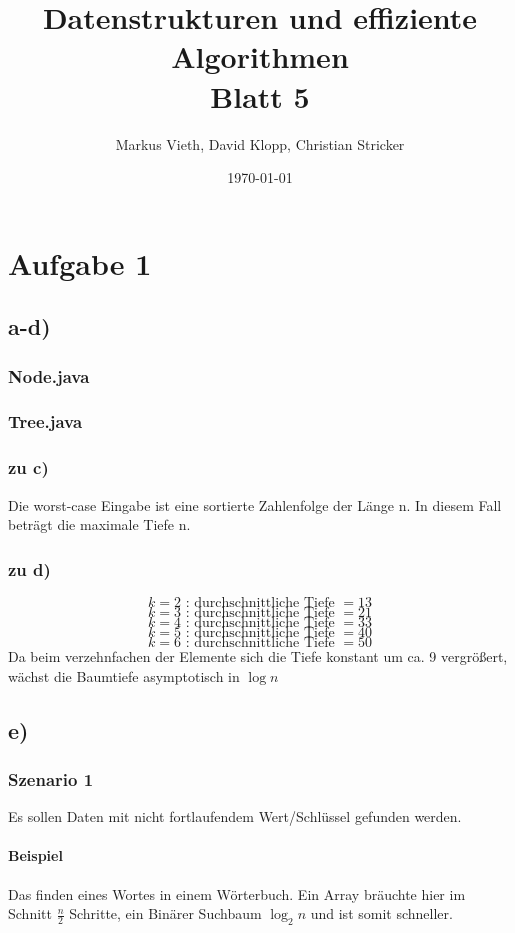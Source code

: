 \documentclass[a4paper,11pt,twoside]{article}
\title{Datenstrukturen und effiziente Algorithmen\\ Blatt 5}
\author{Markus Vieth, David Klopp, Christian Stricker}
\date{\today}
\begin{document}
\maketitle
\cleardoublepage
\pagestyle{myheadings}
\section*{Aufgabe 1}
\subsection*{a-d)}
\subsubsection*{Node.java}

\subsubsection*{Tree.java}

\subsubsection*{zu c)}
Die worst-case Eingabe ist eine sortierte Zahlenfolge der Länge n. In diesem Fall beträgt die maximale Tiefe n.
\subsubsection*{zu d)}
\[k = 2 \text{ : durchschnittliche Tiefe }= 13\]
\[k = 3 \text{ : durchschnittliche Tiefe }= 21\]
\[k = 4 \text{ : durchschnittliche Tiefe }= 33\]
\[k = 5 \text{ : durchschnittliche Tiefe }= 40\]
\[k = 6 \text{ : durchschnittliche Tiefe }= 50\]
Da beim verzehnfachen der Elemente sich die Tiefe konstant um ca. 9 vergrößert, wächst die Baumtiefe asymptotisch in $\log n$ 
\subsection*{e)}
\subsubsection*{Szenario 1}
Es sollen Daten mit nicht fortlaufendem Wert/Schlüssel gefunden werden.\\
\paragraph*{Beispiel} Das finden eines Wortes in einem Wörterbuch. Ein Array bräuchte hier im Schnitt $\frac{n}{2}$ Schritte, ein Binärer Suchbaum $\log_2 n$ und ist somit schneller.
\end{document}

